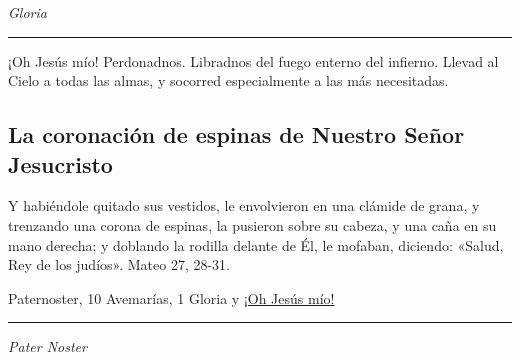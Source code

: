 \documentclass[a4paper,11pt, oneside]{report}
\begin{document}
\indent\textit{Gloria} \par

\begin{center}\rule{1\linewidth}{\linethickness}\end{center}

\medskip
\hypertarget{finalFlagelacion}{¡Oh Jesús mío! Perdonadnos. Libradnos del fuego enterno del infierno. Llevad al Cielo a todas las almas, y socorred especialmente a las más 
necesitadas.}

\subsection*{La coronación de espinas de Nuestro Señor Jesucristo}

Y habiéndole quitado sus vestidos, le envolvieron en una clámide de grana, y trenzando una corona de espinas, la pusieron sobre su cabeza, y una
caña en su mano derecha; y doblando la rodilla delante de Él, le mofaban, diciendo: «Salud, Rey de los judíos». Mateo 27, 28-31.

 Paternoster, 10 Avemarías, 1 Gloria y \hyperlink{finalCoronacion}{¡Oh Jesús mío!}

\medskip

\begin{center}\rule{1\linewidth}{\linethickness}\end{center}

\medskip
\textit{Pater Noster}
\end{document}
